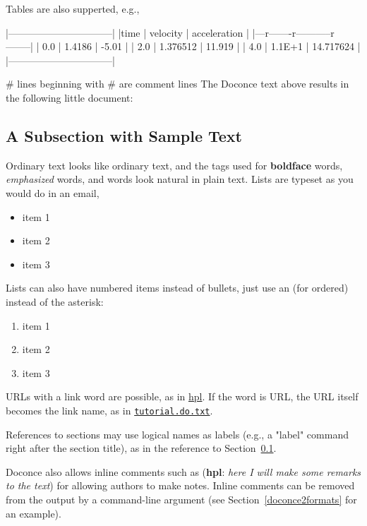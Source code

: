 \documentclass[%
oneside,                 %
final,                   %
chapterprefix=true,      %
open=right               %
10pt]{book}
\newcommand{\inlinecomment}[2]{  ({\bf #1}: \emph{#2})  }
\begin{document}
Tables are also supperted, e.g.,

  |--------------------------------|
  |time  | velocity | acceleration |
  |---r-------r-----------r--------|
  | 0.0  | 1.4186   | -5.01        |
  | 2.0  | 1.376512 | 11.919       |
  | 4.0  | 1.1E+1   | 14.717624    |
  |--------------------------------|

# lines beginning with # are comment lines
\eccq
The Doconce text above results in the following little document:

\subsection{A Subsection with Sample Text}

\label{my:first:sec}

Ordinary text looks like ordinary text, and the tags used for
\textbf{boldface} words, \emph{emphasized} words, and  words look
natural in plain text.  Lists are typeset as you would do in an email,

\begin{itemize}
  \item item 1

  \item item 2

  \item item 3
\end{itemize}

\noindent
Lists can also have numbered items instead of bullets, just use an 
(for ordered) instead of the asterisk:

\begin{enumerate}
 \item item 1

 \item item 2

 \item item 3
\end{enumerate}

\noindent
URLs with a link word are possible, as in \href{{http://folk.uio.no/hpl}}{hpl}.
If the word is URL, the URL itself becomes the link name,
as in \href{{tutorial.do.txt}}{\nolinkurl{tutorial.do.txt}}.

References to sections may use logical names as labels (e.g., a
"label" command right after the section title), as in the reference to
Section~\ref{my:first:sec}.

Doconce also allows inline comments such as \inlinecomment{hpl}{here I will make
some remarks to the text} for allowing authors to make notes. Inline
comments can be removed from the output by a command-line argument
(see Section~\ref{doconce2formats} for an example).
\end{document}
